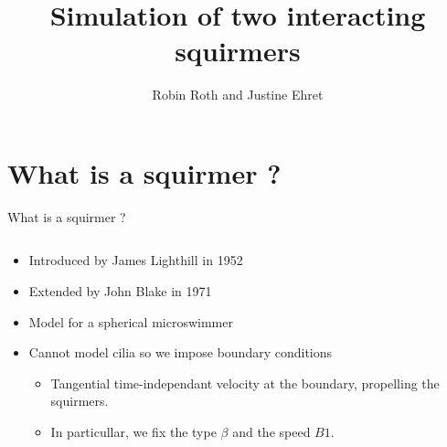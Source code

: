 \documentclass{beamer}
\title{Simulation of two interacting squirmers}
\author{Robin Roth and Justine Ehret}
\institute{Supervised by: Van Landeghem Céline, Giraldi Laetitia}
\begin{document}
\begin{frame}
    \titlepage
\end{frame}

\begin{frame}
    \tableofcontents
\end{frame}

\section{What is a squirmer ?}
\begin{frame}{What is a squirmer ?}
    \begin{columns}[T]
        \begin{column}{0.5\textwidth}
            \begin{itemize}
                \item Introduced by James Lighthill in 1952 \cite{Wikipedia}
                \item Extended by John Blake in 1971 \cite{Wikipedia}
                \item Model for a spherical microswimmer
                \item Cannot model cilia so we impose boundary conditions
                \begin{itemize}
                    \item Tangential time-independant velocity at the boundary, propelling the squirmers.
                    \item In particullar, we fix the type $\beta$ and the speed $B1$.
                \end{itemize}
            \end{itemize}
        \end{column}
        \begin{column}{0.5\textwidth}
            \centering

\end{column}
\end{columns}
\end{frame}
\end{document}
